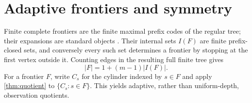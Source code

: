 \documentclass[11pt]{article}
\theoremstyle{definition}
\theoremstyle{remark}
\begin{document}
\section{Adaptive frontiers and symmetry}\label{sec:symmetry}
Finite complete frontiers are the finite maximal prefix codes of the regular tree; their expansions are standard objects \cite{LawsonVdovina}. Their internal sets $I(F)$ are finite prefix-closed sets, and conversely every such set determines a frontier by stopping at the first vertex outside it. Counting edges in the resulting full finite tree gives
\begin{equation}\label{eq:leafcount}
 |F|=1+(m-1)|I(F)|.
\end{equation}
For a frontier $F$, write $C_s$ for the cylinder indexed by $s\in F$ and apply \cref{thm:quotient} to $\{C_s:s\in F\}$. This yields adaptive, rather than uniform-depth, observation quotients.
\end{document}

